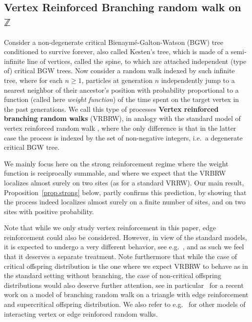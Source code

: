 \documentclass[11pt]{article}
\newcommand{\1}{{\text{\Large $\mathfrak 1$}}}
\begin{document}
\subsection{Vertex Reinforced Branching random walk on $\mathbb Z$}
Consider a non-degenerate critical Bienaym\'e-Galton-Watson (BGW) tree conditioned to survive forever, also called Kesten's tree, which is made of a semi-infinite line of vertices, called the spine, to which are attached independent (type of) critical BGW trees. Now consider a random walk indexed by such infinite tree, where for each $n\ge 1$, particles at generation $n$ independently jump to a nearest neighbor of their ancestor's position with probability proportional to a function (called here {\it weight function}) of the time spent on the target vertex in the past generations. We call this type of processes \textbf{Vertex reinforced branching random walks} (VRBRW), in analogy with the standard model of vertex reinforced random walk \cite{P,V}, where the only difference is that in the latter case the process is indexed by the set of non-negative integers, i.e.~a degenerate critical BGW tree. 

\vspace{0.2cm}
We mainly focus here on the strong reinforcement regime where the weight function is reciprocally summable, and where we expect that the VRBRW localizes almost surely on two sites (as for a standard VRRW). Our main result, Proposition~\ref{prop.strong} below, partly confirms this prediction, by showing that the process indeed localizes almost surely on a finite number of sites, and on two sites with positive probability.  

\vspace{0.2cm}
Note that while we only study vertex reinforcement in this paper, edge reinforcement could also be considered. However, in view of the standard models, it is expected to undergo a very different behavior, see e.g.~\cite{CT17,Dav,T2}, and as such we feel that it deserves a separate treatment. 
Note furthermore that while the case of critical offspring distribution is the one 
where we expect VRBRW to behave as in the standard setting without branching, the case of non-critical offspring distributions would also deserve further attention, see in particular~\cite{GS} for a recent work on a model of branching random walk on a triangle with edge reinforcement and supercritical offspring distribution.  
We also refer to e.g.~\cite{ER,GMR,PR} for other models of interacting vertex or edge reinforced random walks. 
\end{document}
